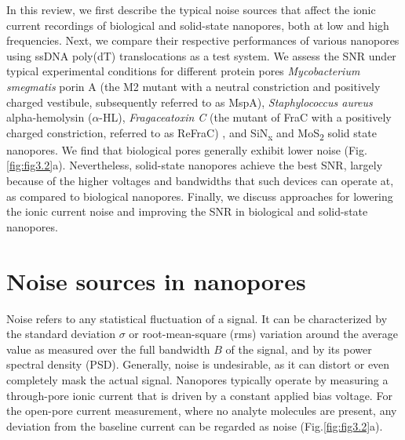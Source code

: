 In this review, we first describe the typical noise sources that affect the ionic current recordings of biological and solid-state nanopores, both at low and high frequencies. Next, we compare their respective performances of various nanopores using ssDNA poly(dT) translocations as a test system. We assess the SNR under typical experimental conditions for different protein pores \emph{Mycobacterium smegmatis} porin A (the M2 mutant with a neutral constriction and positively charged vestibule, subsequently referred to as MspA)\cite{Laszlo2016}, \emph{Staphylococcus aureus} alpha-hemolysin ($\alpha$-HL)\cite{Song1996,Menestrina1986}, \emph{Fragaceatoxin C} (the mutant of FraC with a positively charged constriction, referred to as ReFraC) \cite{Wloka2016,Huang2017a}, and SiN\textsubscript{x}\cite{Venta2013} and MoS\textsubscript{2}\cite{Graf2019} solid state nanopores. We find that biological pores generally exhibit lower noise (Fig.\ref{fig:fig3.2}a). Nevertheless, solid-state nanopores achieve the best SNR, largely because of the higher voltages and bandwidths that such devices can operate at, as compared to biological nanopores. Finally, we discuss approaches for lowering the ionic current noise and improving the SNR in biological and solid-state nanopores.


\section{Noise sources in nanopores}

Noise refers to any statistical fluctuation of a signal. It can be characterized by the standard deviation $\sigma$ or root-mean-square (rms) variation around the average value as measured over the full bandwidth $B$ of the signal, and by its power spectral density (PSD). Generally, noise is undesirable, as it can distort or even completely mask the actual signal. Nanopores typically operate by measuring a through-pore ionic current that is driven by a constant applied bias voltage. For the open-pore current measurement, where no analyte molecules are present, any deviation from the baseline current can be regarded as noise (Fig.\ref{fig:fig3.2}a).



